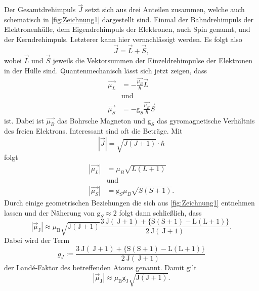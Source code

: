 Der Gesamtdrehimpuls $\vec{J}$ setzt sich aus drei Anteilen zusammen, welche auch schematisch in \autoref{fig:Zeichnung1} dargestellt sind.
Einmal der Bahndrehimpuls der Elektronenhülle, dem Eigendrehimpuls der Elektronen, auch Spin genannt, und der Kerndrehimpuls.
Letzterer kann hier vernachlässigt werden.
Es folgt also
\begin{equation}
    \vec{J} = \vec{L} + \vec{S},
\end{equation}
wobei $\vec{L}$ und $\vec{S}$ jeweils die Vektorsummen der Einzeldrehimpulse der Elektronen in der Hülle sind.
Quantenmechanisch lässt sich jetzt zeigen, dass
\begin{align}
    \vec{\mu_L} &= - \frac{\vec{\mu_B}}{\hbar} \vec{L} \\
    &\text{und} \nonumber \\
    \vec{\mu_S} &= - \text{g}_S \frac{\vec{\mu_B}}{\hbar} \vec{S}
\end{align}
ist.
Dabei ist $\vec{\mu_B}$ das Bohrsche Magneton und $\text{g}_S$ das gyromagnetische Verhältnis des freien Elektrons.
Interessant sind oft die Beträge.
Mit
\begin{equation*}
    \left| \vec{J}\right| = \sqrt{J \left( J + 1 \right)} \cdot \hbar
\end{equation*}
folgt 
\begin{align}
    \left|\vec{\mu_L} \right| &= \mu_B \sqrt{L \left( L + 1 \right)} \\
    &\text{und} \nonumber \\
    \left|\vec{\mu_S} \right| &= \text{g}_S \mu_B \sqrt{S \left( S + 1 \right)}.
\end{align}
Durch einige geometrischen Beziehungen die sich aus \autoref{fig:Zeichnung1} entnehmen lassen und der Näherung von $\text{g}_S \approx 2$ folgt dann schließlich, dass
\begin{equation}
    \left|\vec{\mu}_{\mathrm{J}}\right| \approx \mu_{\mathrm{B}} \sqrt{\mathrm{J}(\mathrm{J}+1)} \frac{3 \mathrm{~J}(\mathrm{~J}+1)+\{\mathrm{S}(\mathrm{S}+1)-\mathrm{L}(\mathrm{L}+1)\}}{2 \mathrm{~J}(\mathrm{~J}+1)} .
\end{equation}
Dabei wird der Term
\begin{equation}
    g_{J}:=\frac{3 \mathrm{~J}(\mathrm{~J}+1)+\{\mathrm{S}(\mathrm{S}+1)-\mathrm{L}(\mathrm{L}+1)\}}{2 \mathrm{~J}(\mathrm{~J}+1)}
\end{equation}
der Landé-Faktor des betreffenden Atoms genannt. Damit gilt
\begin{equation}
    \left|\vec{\mu}_{\mathrm{J}}\right| \approx \mu_{\mathrm{B}} \mathrm{g}_{\mathrm{J}} \sqrt{\mathrm{J}(\mathrm{J}+1)}.
\end{equation}
